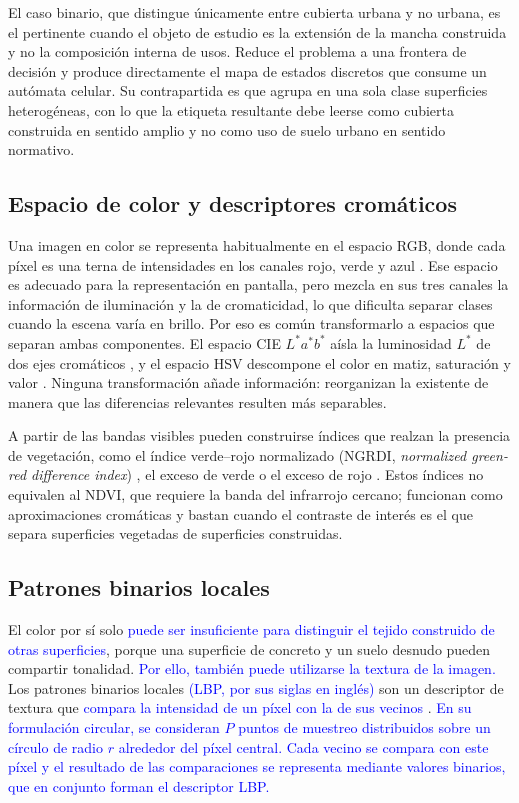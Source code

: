 El caso binario, que distingue únicamente entre cubierta urbana y no urbana, es el pertinente cuando el objeto de estudio es la extensión de la mancha construida y no la composición interna de usos. Reduce el problema a una frontera de decisión y produce directamente el mapa de estados discretos que consume un autómata celular. Su contrapartida es que agrupa en una sola clase superficies heterogéneas, con lo que la etiqueta resultante debe leerse como cubierta construida en sentido amplio y no como uso de suelo urbano en sentido normativo.

\subsection{Espacio de color y descriptores cromáticos}

Una imagen en color se representa habitualmente en el espacio RGB, donde cada píxel es una terna de intensidades en los canales rojo, verde y azul \parencite{GonzalezWoods2018}. Ese espacio es adecuado para la representación en pantalla, pero mezcla en sus tres canales la información de iluminación y la de cromaticidad, lo que dificulta separar clases cuando la escena varía en brillo. Por eso es común transformarlo a espacios que separan ambas componentes. El espacio CIE $L^*a^*b^*$ aísla la luminosidad $L^*$ de dos ejes cromáticos \parencite{GonzalezWoods2018}, y el espacio HSV descompone el color en matiz, saturación y valor \parencite{Smith1978}. Ninguna transformación añade información: reorganizan la existente de manera que las diferencias relevantes resulten más separables.

A partir de las bandas visibles pueden construirse índices que realzan la presencia de vegetación, como el índice verde--rojo normalizado (NGRDI, \textit{normalized green-red difference index}) \parencite{Tucker1979}, el exceso de verde \parencite{Woebbecke1995} o el exceso de rojo \parencite{Meyer1999}. Estos índices no equivalen al NDVI, que requiere la banda del infrarrojo cercano; funcionan como aproximaciones cromáticas y bastan cuando el contraste de interés es el que separa superficies vegetadas de superficies construidas.

\subsection{Patrones binarios locales}

El color por sí solo \textcolor{blue}{puede ser insuficiente para distinguir el
tejido construido de otras superficies}, porque una superficie de concreto y
un suelo desnudo pueden compartir tonalidad. \textcolor{blue}{Por ello, también
puede utilizarse la textura de la imagen.} Los patrones binarios locales
\textcolor{blue}{(LBP, por sus siglas en inglés)} son un descriptor de textura
que \textcolor{blue}{compara la intensidad de un píxel con la de sus vecinos}
\parencite{Ojala2002}. \textcolor{blue}{En su formulación circular, se
consideran $P$ puntos de muestreo distribuidos sobre un círculo de radio $r$
alrededor del píxel central. Cada vecino se compara con este píxel y el
resultado de las comparaciones se representa mediante valores binarios, que en
conjunto forman el descriptor LBP.}

